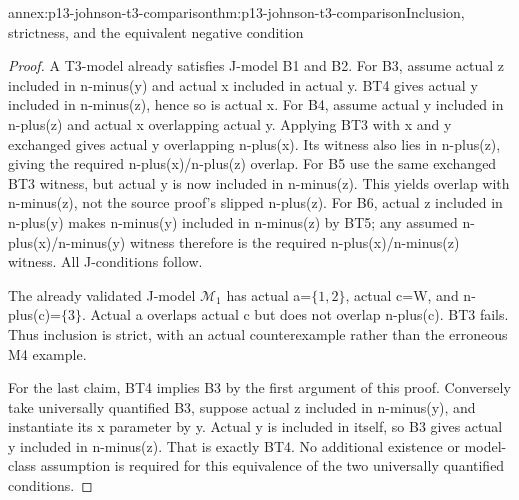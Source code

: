 \begin{annexitem}{annex:p13-johnson-t3-comparison}{thm:p13-johnson-t3-comparison}{Inclusion, strictness, and the equivalent negative condition}
\begin{proof}
A T3-model already satisfies J-model B1 and B2. For B3, assume
actual z included in n-minus(y) and actual x included in actual y.
BT4 gives actual y included in n-minus(z), hence so is actual x.
For B4, assume actual y included in n-plus(z) and actual x overlapping
actual y. Applying BT3 with x and y exchanged gives actual y overlapping
n-plus(x). Its witness also lies in n-plus(z), giving the required
n-plus(x)/n-plus(z) overlap. For B5 use the same exchanged BT3 witness,
but actual y is now included in n-minus(z). This yields overlap with
n-minus(z), not the source proof's slipped n-plus(z).
For B6, actual z included in n-plus(y) makes n-minus(y) included in
n-minus(z) by BT5; any assumed n-plus(x)/n-minus(y) witness therefore
is the required n-plus(x)/n-minus(z) witness. All J-conditions follow.

The already validated J-model \(\mathcal M_1\) has actual a=\(\{1,2\}\),
actual c=W, and n-plus(c)=\(\{3\}\). Actual a overlaps actual c but
does not overlap n-plus(c). BT3 fails. Thus inclusion is strict, with
an actual counterexample rather than the erroneous M4 example.

For the last claim, BT4 implies B3 by the first argument of this proof.
Conversely take universally quantified B3, suppose actual z included
in n-minus(y), and instantiate its x parameter by y. Actual y is
included in itself, so B3 gives actual y included in n-minus(z).
That is exactly BT4. No additional existence or model-class assumption
is required for this equivalence of the two universally quantified conditions.
\end{proof}
\end{annexitem}

